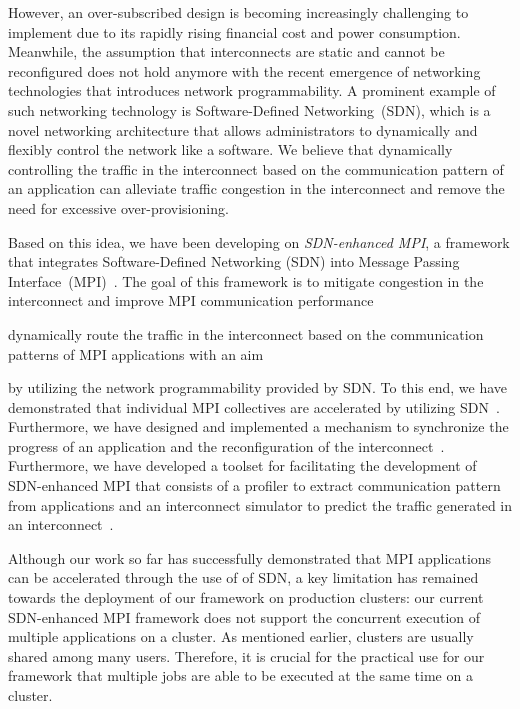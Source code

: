 \documentclass[graybox]{svmult}
\begin{document}
However, an over-subscribed design is becoming increasingly challenging to
implement due to its rapidly rising financial cost and power consumption.
Meanwhile, the assumption that interconnects are static and cannot be
reconfigured does not hold anymore with the recent emergence of networking
technologies that introduces network programmability. A prominent example of
such networking technology is Software-Defined Networking~(SDN), which is a
novel networking architecture that allows administrators to dynamically and
flexibly control the network like a software. We believe that dynamically
controlling the traffic in the interconnect based on the communication pattern
of an application can alleviate traffic congestion in the interconnect and
remove the need for excessive over-provisioning.

Based on this idea, we have been developing on \textit{SDN-enhanced MPI}, a
framework that integrates Software-Defined Networking (SDN) into Message
Passing Interface~(MPI)~\cite{MPIForum2012}. The goal of this framework is to
mitigate congestion in the interconnect and improve MPI communication
performance

dynamically route the traffic in the interconnect based on the communication
patterns of MPI applications with an aim

by utilizing the network programmability provided
by SDN\@. To this end, we have demonstrated that individual MPI collectives
are accelerated by utilizing SDN~\cite{Dashdavaa2014,Takahashi2014}.
Furthermore, we have designed and implemented a mechanism to synchronize the
progress of an application and the reconfiguration of the
interconnect~\cite{Takahashi2015,Takahashi2018}. Furthermore, we have
developed a toolset for facilitating the development of SDN-enhanced MPI that
consists of a profiler to extract communication pattern from applications and
an interconnect simulator to predict the traffic generated in an
interconnect~\cite{Takahashi2017}.

Although our work so far has successfully demonstrated that MPI applications
can be accelerated through the use of of SDN, a key limitation has remained
towards the deployment of our framework on production clusters: our current
SDN-enhanced MPI framework does not support the concurrent execution of
multiple applications on a cluster. As mentioned earlier, clusters are usually
shared among many users. Therefore, it is crucial for the practical use for
our framework that multiple jobs are able to be executed at the same time on a
cluster.
\end{document}
